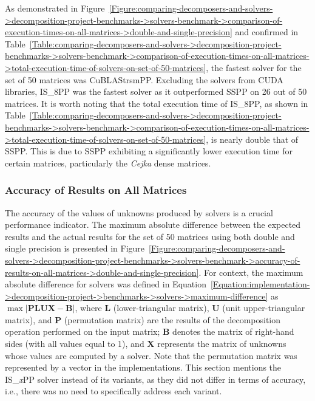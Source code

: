 As demonstrated in Figure~\ref{Figure:comparing-decomposers-and-solvers->decomposition-project-benchmarks->solvers-benchmark->comparison-of-execution-times-on-all-matrices->double-and-single-precision} and confirmed in Table~\ref{Table:comparing-decomposers-and-solvers->decomposition-project-benchmarks->solvers-benchmark->comparison-of-execution-times-on-all-matrices->total-execution-time-of-solvers-on-set-of-50-matrices}, the fastest solver for the set of 50 matrices was CuBLAStrsmPP. Excluding the solvers from CUDA libraries, IS\_8PP was the fastest solver as it outperformed SSPP on 26 out of 50 matrices. It is worth noting that the total execution time of IS\_8PP, as shown in Table~\ref{Table:comparing-decomposers-and-solvers->decomposition-project-benchmarks->solvers-benchmark->comparison-of-execution-times-on-all-matrices->total-execution-time-of-solvers-on-set-of-50-matrices}, is nearly double that of SSPP. This is due to SSPP exhibiting a significantly lower execution time for certain matrices, particularly the \textit{Cejka} dense matrices.


\subsubsection{Accuracy of Results on All Matrices}\label{Subsection:comparing-decomposers-and-solvers->decomposition-project-benchmarks->solvers-benchmark->accuracy-of-results-on-all-matrices}
The accuracy of the values of unknowns produced by solvers is a crucial performance indicator. The maximum absolute difference between the expected results and the actual results for the set of 50 matrices using both double and single precision is presented in Figure~\ref{Figure:comparing-decomposers-and-solvers->decomposition-project-benchmarks->solvers-benchmark->accuracy-of-results-on-all-matrices->double-and-single-precision}. For context, the maximum absolute difference for solvers was defined in Equation~\ref{Equation:implementation->decomposition-project->benchmarks->solvers->maximum-difference} as $\max \left| \mathbf{PLUX} - \mathbf{B} \right|$, where $\mathbf{L}$ (lower-triangular matrix), $\mathbf{U}$ (unit upper-triangular matrix), and $\mathbf{P}$ (permutation matrix) are the results of the decomposition operation performed on the input matrix; $\mathbf{B}$ denotes the matrix of right-hand sides (with all values equal to 1), and $\mathbf{X}$ represents the matrix of unknowns whose values are computed by a solver. Note that the permutation matrix was represented by a vector in the implementations. This section mentions the IS\_\textit{x}PP solver instead of its variants, as they did not differ in terms of accuracy, i.e., there was no need to specifically address each variant.

